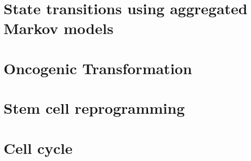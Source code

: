 \documentclass[11pt,a4paper]{report}      %
\begin{document}
\chapter{State transitions using aggregated Markov models}
\label{cha:stamm}


\chapter{Oncogenic Transformation}
\label{cha:oncog-transf}


\chapter{Stem cell reprogramming}
\label{cha:stem-cells}
 

\chapter{Cell cycle}
\label{cha:cell-cycle}








\begin{appendices}
  
  
\end{appendices}






\end{document}
